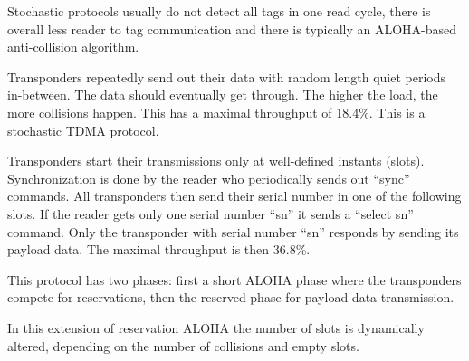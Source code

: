 \begin{mytitle} Stochastic protocols usually do not detect all tags in one read cycle, there is overall less reader to tag communication and there is typically an ALOHA-based anti-collision algorithm.
    \begin{mysubtitle} Transponders repeatedly send out their data with random length quiet periods in-between. The data should eventually get through. The higher the load, the more collisions happen. This has a maximal throughput of 18.4\%. This is a stochastic TDMA protocol.
    \end{mysubtitle}
    \begin{mysubtitle} Transponders start their transmissions only at well-defined instants (slots). Synchronization is done by the reader who periodically sends out ``sync'' commands. All transponders then send their serial number in one of the following slots. If the reader gets only one serial number ``sn'' it sends a ``select sn'' command. Only the transponder with serial number ``sn'' responds by sending its payload data. The maximal throughput is then 36.8\%. 
    \end{mysubtitle}
    \begin{mysubtitle} This protocol has two phases: first a short ALOHA phase where the transponders compete for reservations, then the reserved phase for payload data transmission. 
    \end{mysubtitle}
    \begin{mysubtitle} In this extension of reservation ALOHA the number of slots is dynamically altered, depending on the number of collisions and empty slots.
    \end{mysubtitle}
\end{mytitle}

